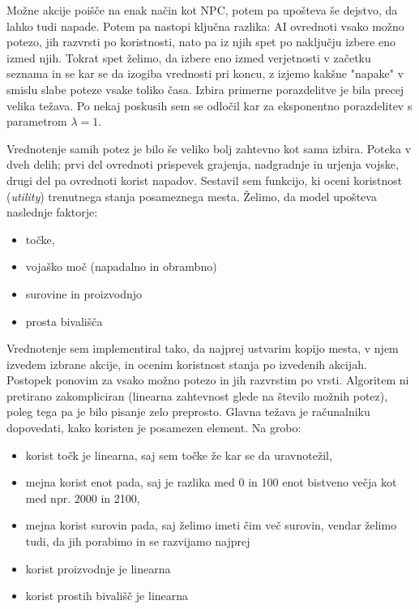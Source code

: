 \documentclass[a4paper, 16pt]{article}
\begin{document}
Možne akcije poišče na enak način kot NPC, potem pa upošteva še dejstvo, da lahko tudi napade. Potem pa nastopi ključna razlika: AI ovrednoti vsako možno potezo, jih razvrsti po koristnosti, nato pa iz njih spet po naključju izbere eno izmed njih.
Tokrat spet želimo, da izbere eno izmed verjetnosti v začetku seznama in se kar se da izogiba vrednosti pri koncu, z izjemo kakšne "napake" v smislu slabe poteze vsake toliko časa.
Izbira primerne porazdelitve je bila precej velika težava. Po nekaj poskusih sem se odločil kar za eksponentno porazdelitev s parametrom $\lambda = 1$.

Vrednotenje samih potez je bilo še veliko bolj zahtevno kot sama izbira. Poteka v dveh delih; prvi del ovrednoti prispevek grajenja, nadgradnje in urjenja vojske, drugi del pa 
ovrednoti korist napadov. Sestavil sem funkcijo, ki oceni koristnost (\textit{utility}) trenutnega stanja posameznega mesta. Želimo, da model upošteva naslednje faktorje:

\begin{itemize}
    \item točke,
    \item vojaško moč (napadalno in obrambno)
    \item surovine in proizvodnjo
    \item prosta bivališča
\end{itemize}

Vrednotenje sem implementiral tako, da najprej ustvarim kopijo mesta, v njem izvedem izbrane akcije, in ocenim koristnost stanja po izvedenih akcijah. Postopek ponovim 
za vsako možno potezo in jih razvrstim po vrsti. Algoritem ni pretirano zakompliciran (linearna zahtevnost glede na število možnih potez), poleg tega pa je bilo pisanje zelo preprosto.
Glavna težava je računalniku dopovedati, kako koristen je posamezen element. Na grobo:

\begin{itemize}
    \item korist točk je linearna, saj sem točke že kar se da uravnotežil,
    \item mejna korist enot pada, saj je razlika med 0 in 100 enot bistveno večja kot med npr. 2000 in 2100,
    \item mejna korist surovin pada, saj želimo imeti čim več surovin, vendar želimo tudi, da jih porabimo in se razvijamo najprej
    \item korist proizvodnje je linearna
    \item korist prostih bivališč je linearna
\end{itemize}
\end{document}
